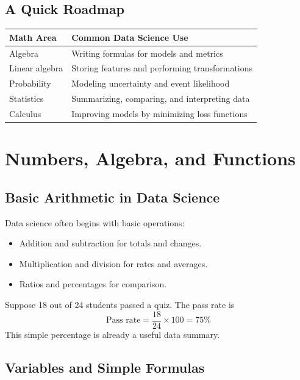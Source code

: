 \documentclass[11pt,a4paper]{article}
\begin{document}
\subsection{A Quick Roadmap}

\begin{longtable}{p{3.2cm}p{8.2cm}}
\toprule
\textbf{Math Area} & \textbf{Common Data Science Use} \\
\midrule
Algebra & Writing formulas for models and metrics \\
Linear algebra & Storing features and performing transformations \\
Probability & Modeling uncertainty and event likelihood \\
Statistics & Summarizing, comparing, and interpreting data \\
Calculus & Improving models by minimizing loss functions \\
\bottomrule
\end{longtable}

\section{Numbers, Algebra, and Functions}

\subsection{Basic Arithmetic in Data Science}

Data science often begins with basic operations:

\begin{itemize}[leftmargin=*]
  \item Addition and subtraction for totals and changes.
  \item Multiplication and division for rates and averages.
  \item Ratios and percentages for comparison.
\end{itemize}

\begin{examplebox}
Suppose 18 out of 24 students passed a quiz. The pass rate is
\[
\text{Pass rate} = \frac{18}{24} \times 100 = 75\%
\]
This simple percentage is already a useful data summary.
\end{examplebox}

\subsection{Variables and Simple Formulas}
\end{document}
